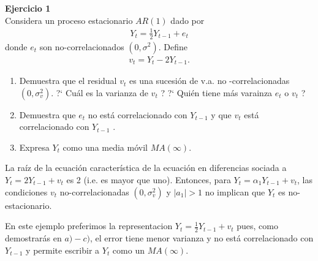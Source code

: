 \documentclass[a4paper, 11pt]{article}
\newenvironment{problem}[2][Ejercicio]
{ \begin{mdframed}[backgroundcolor= red!50] \textbf{#1 #2} \\}
	{  \end{mdframed}}
\begin{document}
	\setlength{\parskip}{\medskipamount}
	\setlength{\parindent}{0pt}
\begin{problem}{1}
    Considera un proceso estacionario $AR(1)$ dado por 
    \begin{align*}
        Y_t = \frac{1}{2}Y_{t-1} + e_t 
    \end{align*}
    donde $e_t$ son no-correlacionados $(0,\sigma^2)$. Define 
    \begin{align*}
        v_t = Y_t - 2Y_{t-1}.
    \end{align*}
    \begin{enumerate}
        \item Demuestra que el residual $v_t$ es una sucesión de v.a. no -correlacionadas $(0, \sigma_v^2)$. ?` Cuál es la varianza de $v_t$ ? ?` Quién tiene más varainza $e_t$ o $v_t$ ?
        \item Demuestra que $e_t$ no está correlacionado con $Y_{t-1}$ y que $v_t$ está correlacionado con $Y_{t-1}$ .
        \item Expresa $Y_t$ como una media móvil $MA(\infty)$.
    \end{enumerate}

    La raíz de la ecuación característica de la ecuación en diferencias sociada a $Y_t = 2 Y_{t-1} + v_{t }$ es 2 (i.e. es mayor que uno). Entonces, para $ Y_t = \alpha_1 Y_{t-1} + v_t$, las condiciones $v_t$ no-correlacionadas $(0, \sigma^2_v )$ y $|a_1| > 1$ no implican que $Y_t$ es no-estacionario.

    En este ejemplo preferimos la representacion $Y_t = \frac{1}{2}Y_{t-1} + v_t$ pues, como demostrarás en $a)-c)$, el error tiene menor varianza y no está correlacionado con $Y_{t-1}$ y permite escribir a $Y_t$ como un $MA(\infty)$.
    
\end{problem}
\end{document}
